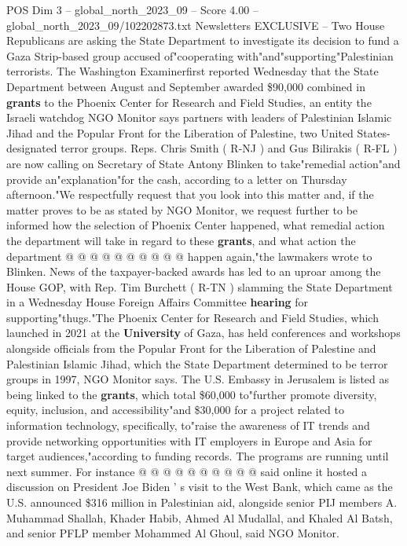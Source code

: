 \begin{textsample}{POS Dim 3 – global\_north\_2023\_09 – Score 4.00 – global\_north\_2023\_09/102202873.txt}  \label{ex:f3_pos_070}
Newsletters EXCLUSIVE -- Two House Republicans are asking the State Department to investigate its decision to fund a Gaza Strip-based group accused of"cooperating with"and"supporting"Palestinian terrorists.
The Washington Examinerfirst reported Wednesday that the State Department between August and September awarded \$90,000 combined in \textbf{grants} to the Phoenix Center for Research and Field Studies, an entity the Israeli watchdog NGO Monitor says partners with leaders of Palestinian Islamic Jihad and the Popular Front for the Liberation of Palestine, two United States-designated terror groups.
Reps.
Chris Smith ( R-NJ ) and Gus Bilirakis ( R-FL ) are now calling on Secretary of State Antony Blinken to take"remedial action"and provide an"explanation"for the cash, according to a letter on Thursday afternoon."We respectfully request that you look into this matter and, if the matter proves to be as stated by NGO Monitor, we request further to be informed how the selection of Phoenix Center happened, what remedial action the department will take in regard to these \textbf{grants}, and what action the department @ @ @ @ @ @ @ @ @ @ happen again,"the lawmakers wrote to Blinken.
News of the taxpayer-backed awards has led to an uproar among the House GOP, with Rep.
Tim Burchett ( R-TN ) slamming the State Department in a Wednesday House Foreign Affairs Committee \textbf{hearing} for supporting"thugs."The Phoenix Center for Research and Field Studies, which launched in 2021 at the \textbf{University} of Gaza, has held conferences and workshops alongside officials from the Popular Front for the Liberation of Palestine and Palestinian Islamic Jihad, which the State Department determined to be terror groups in 1997, NGO Monitor says.
The U.S.
Embassy in Jerusalem is listed as being linked to the \textbf{grants}, which total \$60,000 to"further promote diversity, equity, inclusion, and accessibility"and \$30,000 for a project related to information technology, specifically, to"raise the awareness of IT trends and provide networking opportunities with IT employers in Europe and Asia for target audiences,"according to funding records.
The programs are running until next summer.
For instance @ @ @ @ @ @ @ @ @ @ said online it hosted a discussion on President Joe Biden ' s visit to the West Bank, which came as the U.S. announced \$316 million in Palestinian aid, alongside senior PIJ members A.
Muhammad Shallah, Khader Habib, Ahmed Al Mudallal, and Khaled Al Batsh, and senior PFLP member Mohammed Al Ghoul, said NGO Monitor.

\end{textsample}
